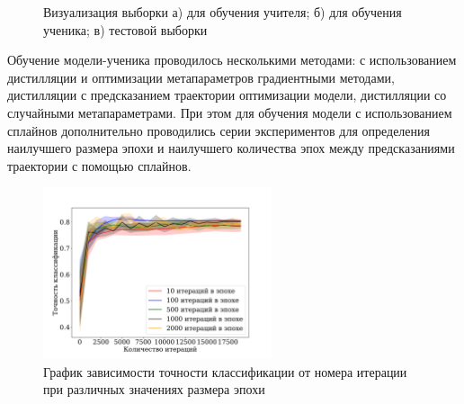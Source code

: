 \documentclass[12pt, twoside]{article}
\begin{document}
\begin{figure}[!ht]
{\begin{minipage}[h]{0.5\linewidth}
    \end{minipage}}
    \caption{Визуализация выборки а) для обучения учителя; б) для обучения ученика; в) тестовой выборки}
    \label{fig:synt_data}
\end{figure}


Обучение модели-ученика проводилось несколькими методами: с использованием дистилляции и оптимизации метапараметров градиентными методами, дистилляции с предсказанием траектории оптимизации модели, дистилляции со случайными метапараметрами. При этом для обучения модели с использованием сплайнов дополнительно проводились серии экспериментов для определения наилучшего размера эпохи и наилучшего количества эпох между предсказаниями траектории с помощью сплайнов.

\begin{figure}[!ht]
    \centering
    \includegraphics[width=0.6\textwidth]{linear_epoch_size.pdf}
    \caption{График зависимости точности классификации от номера итерации при различных значениях размера эпохи}
    \label{fig:epoch_size}
\end{figure}
\end{document}
